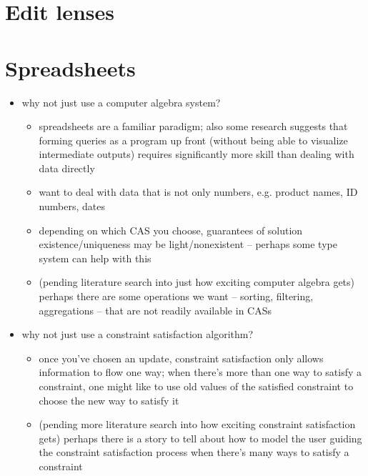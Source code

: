 \documentclass{book}
\begin{document}
\section{Edit lenses}
\section{Spreadsheets}
\begin{itemize}
    \item why not just use a computer algebra system?
        \begin{itemize}
            \item spreadsheets are a familiar paradigm; also some research
                suggests that forming queries as a program up front (without
                being able to visualize intermediate outputs) requires
                significantly more skill than dealing with data directly
            \item want to deal with data that is not only numbers, e.g.
                product names, ID numbers, dates
            \item depending on which CAS you choose, guarantees of solution
                existence/uniqueness may be light/nonexistent -- perhaps
                some type system can help with this
            \item (pending literature search into just how exciting computer
                algebra gets) perhaps there are some operations we want --
                sorting, filtering, aggregations -- that are not readily
                available in CASs
        \end{itemize}
    \item why not just use a constraint satisfaction algorithm?
        \begin{itemize}
            \item once you've chosen an update, constraint satisfaction only
                allows information to flow one way; when there's more than
                one way to satisfy a constraint, one might like to use old
                values of the satisfied constraint to choose the new way to
                satisfy it
            \item (pending more literature search into how exciting
                constraint satisfaction gets) perhaps there is a story to
                tell about how to model the user guiding the constraint
                satisfaction process when there's many ways to satisfy a
                constraint
        \end{itemize}
\end{itemize}
\end{document}
